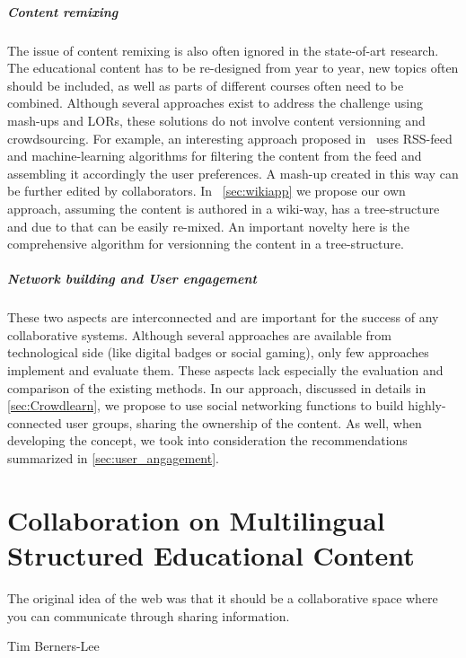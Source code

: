 \documentclass[ngerman,UKenglish,table]{scrbook}
\begin{document}
\paragraph{Content remixing}
The issue of content remixing is also often ignored in the state-of-art research.
The educational content has to be re-designed from year to year, new topics often should be included, as well as parts of different courses often need to be combined.
Although several approaches exist to address the challenge using mash-ups and LORs, these solutions do not involve content versionning and crowdsourcing. 
For example, an interesting approach proposed in~\cite{Auinger2009} uses RSS-feed and machine-learning algorithms for filtering the content from the feed and assembling it accordingly the user preferences.
A mash-up created in this way can be further edited by collaborators.
In ~\autoref{sec:wikiapp} we propose our own approach, assuming the content is authored in a wiki-way, has a tree-structure and due to that can be easily re-mixed.
An important novelty here is the comprehensive algorithm for versionning the content in a tree-structure.

\paragraph{Network building and User engagement}
These two aspects are interconnected and are important for the success of any collaborative systems.
Although several approaches are available from technological side (like digital badges or social gaming), only few approaches implement and evaluate them.
These aspects lack especially the evaluation and comparison of the existing methods. 
In our approach, discussed in details in \autoref{sec:Crowdlearn}, we propose to use social networking functions to build highly-connected user groups, sharing the ownership of the content.
As well, when developing the concept, we took into consideration the recommendations summarized in \autoref{sec:user_angagement}.

\chapter{Collaboration on Multilingual Structured Educational Content}
\label{chapter:collaboration}

\epigraph{The original idea of the web was that it should be a collaborative space where you can communicate through sharing information.}{Tim Berners-Lee}
\end{document}
